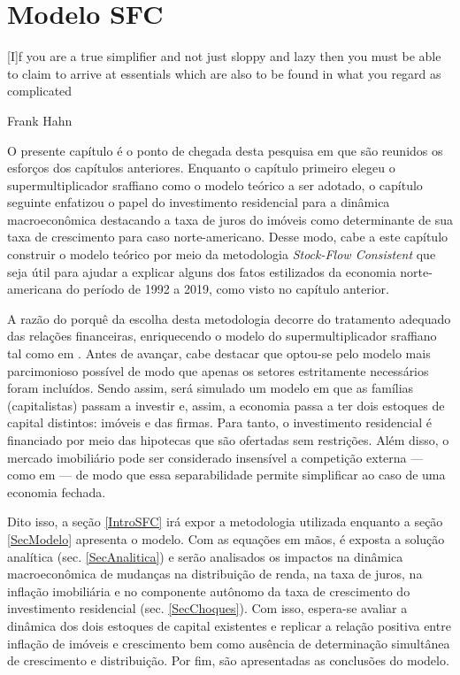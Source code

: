 
\chapter{Modelo SFC}\label{CapModelo}

\epigraph{[I]f you are a true simplifier and not just
sloppy and lazy then you must be able to claim to arrive at essentials which are also to be
found in what you regard as complicated}{Frank Hahn}

O presente capítulo é o ponto de chegada desta pesquisa em que são reunidos os esforços dos capítulos anteriores. Enquanto o capítulo primeiro elegeu o supermultiplicador sraffiano como o modelo teórico a ser adotado, o capítulo seguinte  enfatizou o papel do investimento residencial para a dinâmica macroeconômica destacando a taxa de juros do imóveis como determinante de sua taxa de crescimento para caso norte-americano. Desse modo, cabe a este capítulo construir o modelo teórico por meio da metodologia \textit{Stock-Flow Consistent}  que seja útil para ajudar a explicar alguns dos fatos estilizados da economia norte-americana do período de 1992 a 2019, como visto no capítulo anterior.

A razão do porquê da escolha desta metodologia decorre do tratamento adequado das relações financeiras, enriquecendo o modelo do supermultiplicador sraffiano tal como em \textcite{brochier_supermultiplier_2018}. Antes de avançar, cabe destacar que optou-se pelo modelo mais parcimonioso possível de modo que apenas os setores estritamente necessários foram incluídos. Sendo assim, será simulado um modelo em que as famílias (capitalistas) passam a investir e, assim, a economia passa a ter dois estoques de capital distintos: imóveis e das firmas. Para tanto, o investimento residencial é financiado por meio das hipotecas que são ofertadas sem restrições. 
Além disso, o mercado imobiliário pode ser considerado insensível a competição externa --- como em \textcite{duesenberry_investment_1958} --- de modo que essa separabilidade permite simplificar ao caso de uma economia fechada.


Dito isso, a seção \ref{IntroSFC} irá expor a metodologia utilizada enquanto a seção \ref{SecModelo} apresenta o modelo. Com as equações em mãos, é exposta a solução analítica (sec. \ref{SecAnalitica}) e serão analisados os impactos na dinâmica macroeconômica de mudanças na distribuição de renda, na taxa de juros, na inflação imobiliária e no componente autônomo da taxa de crescimento do investimento residencial (sec. \ref{SecChoques}). Com isso, espera-se avaliar a dinâmica dos dois estoques de capital existentes e replicar a relação positiva entre inflação de imóveis e crescimento bem como ausência de determinação simultânea de crescimento e distribuição.
Por fim, são apresentadas as conclusões do modelo.






